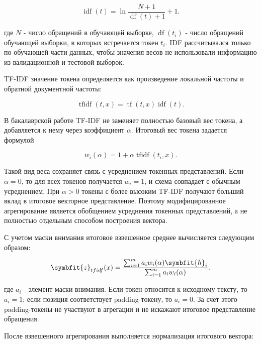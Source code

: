 \documentclass[14pt,a4paper]{extarticle}
\numberwithin{figure}{section}
\numberwithin{table}{section}
\begin{document}
\begin{equation}\operatorname{idf}(t)=\ln\frac{N+1}{\operatorname{df}(t)+1}+1.\label{eq:idf}\end{equation}

где \(N\) - число обращений в обучающей выборке, \(\operatorname{df}(t_i)\) - число обращений
обучающей выборки, в которых встречается токен \(t_i\). IDF рассчитывался
только по обучающей части данных, чтобы значения весов не использовали
информацию из валидационной и тестовой выборок.

TF-IDF значение токена определяется как произведение локальной частоты и
обратной документной частоты:

\begin{equation}\operatorname{tfidf}(t,x)=\operatorname{tf}(t,x)\operatorname{idf}(t).\label{eq:tfidf}\end{equation}

В бакалаврской работе TF-IDF не заменяет полностью базовый вес токена, а
добавляется к нему через коэффициент \(\alpha\). Итоговый вес токена задается
формулой

\begin{equation}w_i(\alpha)=1+\alpha\operatorname{tfidf}(t_i,x).\label{eq:tfidf-weight}\end{equation}

Такой вид веса сохраняет связь с усреднением токенных представлений. Если \(\alpha=0\), то для
всех токенов получается \(w_i=1\), и схема совпадает с обычным
усреднением. При \(\alpha>0\) токены с более высоким TF-IDF
получают больший вклад в итоговое векторное представление. Поэтому модифицированное
агрегирование является обобщением усреднения токенных представлений, а не полностью отдельным
способом построения вектора.

С учетом маски внимания итоговое взвешенное среднее вычисляется
следующим образом:

\begin{equation}\symbfit{z}_{tfidf}(x)=\frac{\sum_{i=1}^{m}a_iw_i(\alpha)\symbfit{h}_i}{\sum_{i=1}^{m}a_iw_i(\alpha)}.\label{eq:tfidf-pooling}\end{equation}

где \(a_i\) - элемент маски внимания. Если токен относится к исходному
тексту, то \(a_i=1\); если позиция соответствует padding-токену, то
\(a_i=0\). За счет этого padding-токены не участвуют в агрегации и не искажают
итоговое представление обращения.

После взвешенного агрегирования выполняется нормализация итогового вектора:
\end{document}

